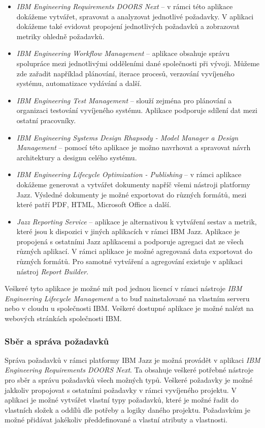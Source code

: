 \documentclass[czech,master,public,dept460,male,cpdeclaration,oneside]{diploma}
\begin{document}
\begin{itemize}
\item \textit{IBM Engineering Requirements DOORS Next} -- v rámci této aplikace dokážeme vytvářet, spravovat a analyzovat jednotlivé požadavky. V aplikaci dokážeme také evidovat propojení jednotlivých požadavků a zobrazovat metriky ohledně požadavků.
\item \textit{IBM Engineering Workflow Management} -- aplikace obsahuje správu spolupráce mezi jednotlivými odděleními dané společnosti při vývoji. Můžeme zde zařadit například plánování, iterace procesů, verzování vyvíjeného systému, automatizace vydávání a další.
\item \textit{IBM Engineering Test Management} -- slouží zejména pro plánování a organizaci testování vyvíjeného systému. Aplikace podporuje sdílení dat mezi ostatní pracovníky.
\item \textit{IBM Engineering Systems Design Rhapsody - Model Manager a Design Management} -- pomocí této aplikace je možno navrhovat a spravovat návrh architektury a designu celého systému.
\item \textit{IBM Engineering Lifecycle Optimization - Publishing} -- v rámci aplikace dokážeme generovat a vytvářet dokumenty napříč všemi nástroji platformy Jazz. Výsledné dokumenty je možné exportovat do různých formátů, mezi které patří PDF, HTML, Microsoft Office a další.
\item \textit{Jazz Reporting Service} -- aplikace je alternativou k vytváření sestav a metrik, které jsou k dispozici v jiných aplikacích v rámci IBM Jazz. Aplikace je propojená s ostatními Jazz aplikacemi a podporuje agregaci dat ze všech různých aplikací. V rámci aplikace je možné agregovaná data exportovat do různých formátů. Pro samotné vytváření a agregování existuje v aplikaci nástroj \textit{Report Builder}.
\end{itemize}

Veškeré tyto aplikace je možné mít pod jednou licencí v rámci nástroje \textit{IBM Engineering Lifecycle Management} a to buď nainstalované na vlastním serveru nebo v cloudu u společnosti IBM. Veškeré dostupné aplikace je možné nalézt na webových stránkách společnosti IBM. \cite{ref:jazz_products}

\subsubsection{Sběr a správa požadavků}
Správa požadavků v rámci platformy IBM Jazz je možná provádět v aplikaci \textit{IBM Engineering Requirements DOORS Next}. Ta obsahuje veškeré potřebné nástroje pro sběr a správu požadavků všech možných typů. Veškeré požadavky je možné jakkoliv propojovat s ostatními požadavky v rámci vyvíjeného projektu. V aplikaci je možné vytvářet vlastní typy požadavků, které je možné řadit do vlastních složek a oddílů dle potřeby a logiky daného projektu. Požadavkům je možné přidávat jakékoliv předdefinované a vlastní atributy a vlastnosti.
\end{document}
